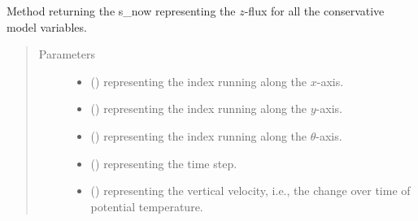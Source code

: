 \documentclass[letterpaper,10pt,english]{sphinxmanual}
\begin{document}
\begin{fulllineitems}
\begin{fulllineitems}
\begin{quote}
\begin{description}
\begin{itemize}
\end{itemize}


\end{description}\end{quote}

\end{fulllineitems}


\begin{fulllineitems}
\label{\detokenize{api:dycore.flux_isentropic.FluxIsentropic.get_vertical_fluxes}}
Method returning the s\_now representing the \(z\)-flux for all the conservative
model variables.
\begin{quote}\begin{description}
\item[{Parameters}] \leavevmode\begin{itemize}
\item {} 
 () \textendash{}  representing the index running along the \(x\)-axis.

\item {} 
 () \textendash{}  representing the index running along the \(y\)-axis.

\item {} 
 () \textendash{}  representing the index running along the \(\theta\)-axis.

\item {} 
 () \textendash{}  representing the time step.

\item {} 
 () \textendash{}  representing the vertical velocity, i.e., the change over time of potential temperature.


\end{itemize}
\end{description}
\end{quote}
\end{fulllineitems}
\end{fulllineitems}
\end{document}
